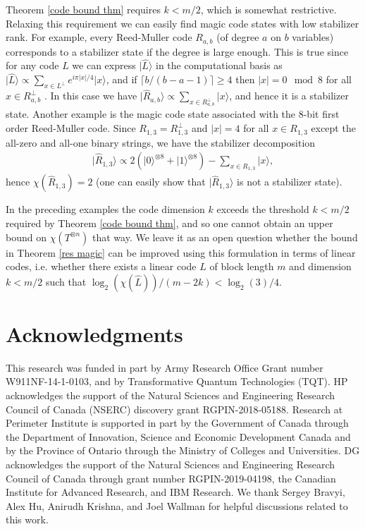 \documentclass[a4paper,onecolumn,11pt,accepted=2021-11-11]{quantumarticle}
\newcommand{\hket}[1]{\ket{\hat{#1}}}
\newcommand{\ket}[1]{\ensuremath{\lvert #1 \rangle}}
\begin{document}
Theorem \ref{code bound thm} requires $k < m/2$, which is somewhat restrictive. Relaxing this requirement we can easily find magic code states with low stabilizer rank. For example, every Reed-Muller code $R_{a,b}$ (of degree $a$ on $b$ variables) corresponds to a stabilizer state if the degree is large enough. 
This is true since for any code $L$ we can express $\hket{L}$ in the computational basis as $\hket{L} \propto \sum_{x \in L^\perp}e^{i\pi |x|/4}\ket{x}$, and if $\lceil b/(b-a-1) \rceil \geq 4$ then $|x| = 0 \mod 8$ for all $x \in R_{a,b}^\perp$ \cite{macwilliams1977theory}. In this case we have $\ket{\hat{R}_{a,b}} \propto \sum_{x \in R_{a,b}^{\perp}} \ket{x}$, and hence it is a stabilizer state.
Another example is the magic code state associated with the 8-bit first order Reed-Muller code. Since $R_{1,3}= R_{1,3}^\perp$ and $|x| = 4$ for all $x \in R_{1,3}$ except the all-zero and all-one binary strings, we have the stabilizer decomposition
\begin{align}
\ket{\hat{R}_{1,3}}\propto 2(\ket{0}^{\otimes 8} + \ket{1}^{\otimes 8}) - \sum_{x \in {R_{1,3}}} \ket{x},
\end{align}
hence $\chi(\hat{R}_{1,3}) = 2$ (one can easily show that $\ket{\hat{R}_{1,3}}$ is not a stabilizer state).

In the preceding examples the code dimension $k$ exceeds the threshold $k < m/2$ required by Theorem \ref{code bound thm}, and so one cannot obtain an upper bound on $\chi(T^{\otimes n})$ that way. We leave it as an open question whether the bound in Theorem \ref{res magic} can be improved using this formulation in terms of linear codes, i.e. whether there exists a linear code $L$ of block length $m$ and dimension $k < m/2$ such that $\log_2(\chi(\hat{L}))/(m-2k) < \log_2(3)/4$.
\section*{Acknowledgments}
This research was funded in part by Army Research Office Grant number W911NF-14-1-0103, and by Transformative Quantum Technologies (TQT). HP acknowledges the support of the Natural Sciences and Engineering Research Council of Canada (NSERC) discovery grant RGPIN-2018-05188. Research at Perimeter Institute is supported in part by the Government of Canada through the Department of Innovation, Science and Economic Development Canada and by the Province of Ontario through the Ministry of Colleges and Universities. DG acknowledges the support of the Natural Sciences and Engineering Research Council of Canada through grant number RGPIN-2019-04198, the Canadian Institute for Advanced Research, and IBM Research. We thank Sergey Bravyi, Alex Hu, Anirudh Krishna, and Joel Wallman for helpful discussions related to this work. 
\end{document}
